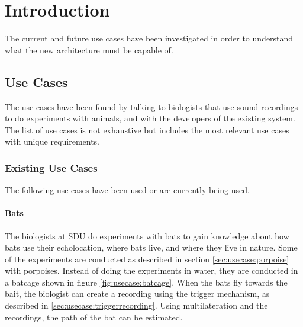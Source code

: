 \chapter{Introduction}
The current and future use cases have been investigated in order to understand what the new architecture must be capable of.


\section{Use Cases} \label{sec:usecases}
The use cases have been found by talking to biologists that use sound recordings to do experiments with animals, and with the developers of the existing system. The list of use cases is not exhaustive but includes the most relevant use cases with unique requirements.

\subsection{Existing Use Cases}
The following use cases have been used or are currently being used.

\subsubsection{Bats} \label{sec:usecase:bats}
The biologists at SDU do experiments with bats to gain knowledge about how bats use their echolocation, where bats live, and where they live in nature.
Some of the experiments are conducted as described in section \ref{sec:usecase:porpoise} with porpoises. Instead of doing the experiments in water, they are conducted in a batcage shown in figure \ref{fig:usecase:batcage}. When the bats fly towards the bait, the biologist can create a recording using the trigger mechanism, as described in \ref{sec:usecase:triggerrecording}. Using multilateration and the recordings, the path of the bat can be estimated.

